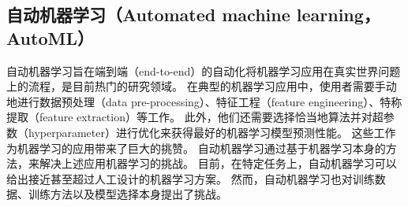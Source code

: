 


\subsection{自动机器学习（Automated machine learning，AutoML）}

自动机器学习旨在端到端（end-to-end）的自动化将机器学习应用在真实世界问题上的流程，是目前热门的研究领域。
在典型的机器学习应用中，使用者需要手动地进行数据预处理（data pre-processing）、特征工程（feature engineering）、特称提取（feature extraction）等工作。
此外，他们还需要选择恰当地算法并对超参数（hyperparameter）进行优化来获得最好的机器学习模型预测性能。
这些工作为机器学习的应用带来了巨大的挑赞。
自动机器学习通过基于机器学习本身的方法，来解决上述应用机器学习的挑战。
目前，在特定任务上，自动机器学习可以给出接近甚至超过人工设计的机器学习方案。
然而，自动机器学习也对训练数据、训练方法以及模型选择本身提出了挑战。




